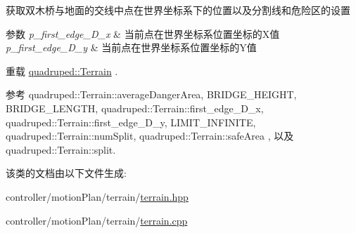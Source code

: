 获取双木桥与地面的交线中点在世界坐标系下的位置以及分割线和危险区的设置 


\begin{DoxyParams}{参数}
{\em p\+\_\+first\+\_\+edge\+\_\+\+D\+\_\+x} & 当前点在世界坐标系位置坐标的\+X值 \\
\hline
{\em p\+\_\+first\+\_\+edge\+\_\+\+D\+\_\+y} & 当前点在世界坐标系位置坐标的\+Y值 \\
\hline
\end{DoxyParams}


重载 \hyperlink{classquadruped_1_1Terrain}{quadruped\+::\+Terrain} .



参考 quadruped\+::\+Terrain\+::average\+Danger\+Area, B\+R\+I\+D\+G\+E\+\_\+\+H\+E\+I\+G\+HT, B\+R\+I\+D\+G\+E\+\_\+\+L\+E\+N\+G\+TH, quadruped\+::\+Terrain\+::first\+\_\+edge\+\_\+\+D\+\_\+x, quadruped\+::\+Terrain\+::first\+\_\+edge\+\_\+\+D\+\_\+y, L\+I\+M\+I\+T\+\_\+\+I\+N\+F\+I\+N\+I\+TE, quadruped\+::\+Terrain\+::num\+Split, quadruped\+::\+Terrain\+::safe\+Area , 以及 quadruped\+::\+Terrain\+::split.



该类的文档由以下文件生成\+:\begin{DoxyCompactItemize}
\item 
controller/motion\+Plan/terrain/\hyperlink{terrain_8hpp}{terrain.\+hpp}\item 
controller/motion\+Plan/terrain/\hyperlink{terrain_8cpp}{terrain.\+cpp}\end{DoxyCompactItemize}

